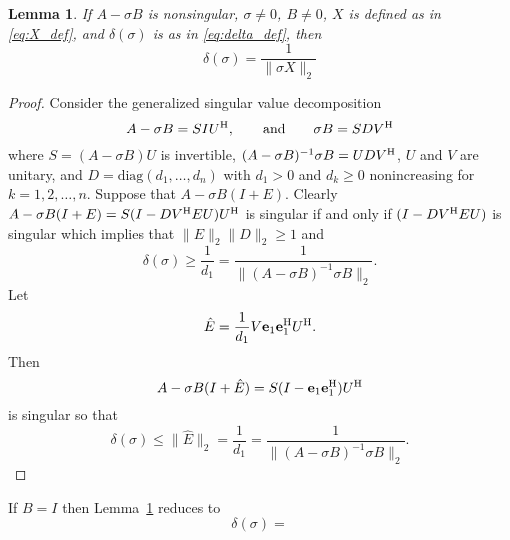 \documentclass[12pt]{article}
\def\eqand{\qquad\mbox{and}\qquad}
\def\vec#1{{\bf #1}}
\def\H{{\rm H}}
\def\diag{\mbox{diag}}
\newtheorem{lemma}{Lemma}
\begin{document}
\begin{lemma}
  \label{lm:X_norm_bound}
  If $A-\sigma B$ is nonsingular, $\sigma \neq 0$, $B\neq 0$, $X$ is
  defined as in \eqref{eq:X_def}, and $\delta(\sigma)$ is as in
  \eqref{eq:delta_def}, then
  \begin{equation*}
     \delta(\sigma) 
     = \frac{1}{\|\sigma X\|_2}
  \end{equation*}
\end{lemma}
\begin{proof}
  Consider the generalized singular value decomposition
  \begin{equation*}
    A - \sigma B = S I U^\H,\eqand
    \sigma B = S D V^\H
  \end{equation*}
  where $S=(A-\sigma B)U$ is invertible,
  $(A-\sigma B)^{-1}\sigma B = U D V^\H$, $U$ and $V$ are unitary, and
  $D = \diag(d_1, \ldots, d_n)$ with $d_1 > 0$ and $d_k\geq 0$
  nonincreasing for $k=1,2,\ldots, n$.  Suppose that
  $A-\sigma B(I+ E)$.  Clearly
  $A-\sigma B (I+E) = S (I - D V^\H E U) U^\H$ is
  singular if and only if $(I - D V^\H E U)$ is singular which implies
  that $\|E\|_2 \|D\|_2 \geq 1$ and
  \begin{equation*}
    \delta(\sigma)
    \geq \frac{1}{d_1} =
    \frac{1}{\|(A-\sigma B)^{-1}\sigma B\|_2}.
  \end{equation*}
  Let  
  \begin{equation*}
    \hat{E} = \frac{1}{d_1}V \vec{e}_1 \vec{e}_1^\H U^\H.
  \end{equation*}
  Then
  \begin{equation*}
    A-\sigma B (I+\hat{E}) = S (I-\vec{e}_1 \vec{e}_1^\H) U^\H
  \end{equation*}
  is singular so that
  \begin{equation*}
    \delta(\sigma)
    \leq \|\hat{E}\|_2 
    = \frac{1}{d_1} = \frac{1}{\|(A-\sigma B)^{-1} \sigma B\|_2}.
  \end{equation*}
\end{proof}

If $B=I$ then Lemma~\ref{lm:X_norm_bound} reduces to
\begin{equation*}
  \delta(\sigma) = 
\end{equation*}
\end{document}
